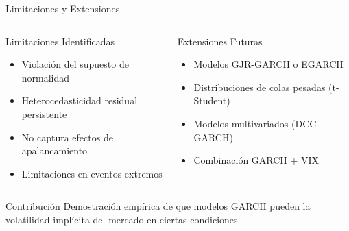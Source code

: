 \begin{frame}{Limitaciones y Extensiones}
    \begin{columns}
        \begin{column}{0.5\textwidth}
            \begin{block}{Limitaciones Identificadas}
                \begin{itemize}
                    \item Violación del supuesto de normalidad
                    \item Heterocedasticidad residual persistente
                    \item No captura efectos de apalancamiento
                    \item Limitaciones en eventos extremos
                \end{itemize}
            \end{block}
        \end{column}
        
        \begin{column}{0.5\textwidth}
            \begin{block}{Extensiones Futuras}
                \begin{itemize}
                    \item Modelos GJR-GARCH o EGARCH
                    \item Distribuciones de colas pesadas (t-Student)
                    \item Modelos multivariados (DCC-GARCH)
                    \item Combinación GARCH + VIX
                \end{itemize}
            \end{block}
        \end{column}
    \end{columns}
    
    \vspace{1em}
    
    \begin{alertblock}{Contribución}
        Demostración empírica de que modelos GARCH pueden  la volatilidad implícita del mercado en ciertas condiciones
    \end{alertblock}
\end{frame}


